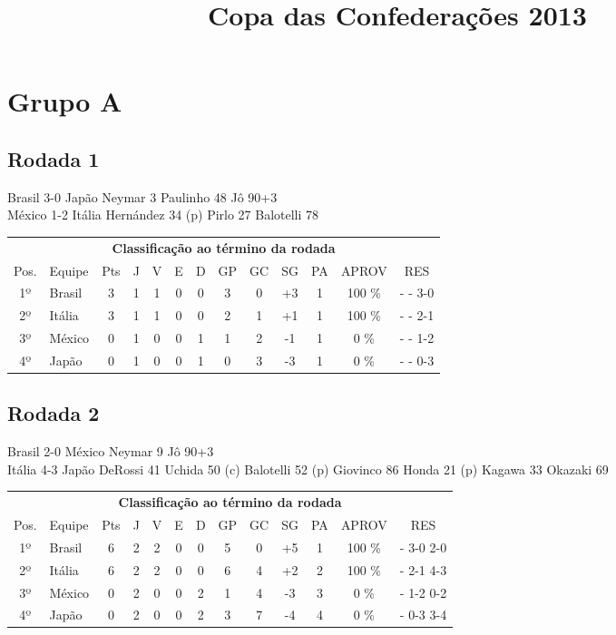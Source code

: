 \documentclass{article}
\title{\textbf{Copa das Confederações 2013}}
\author{}
\date{}
\begin{document}
\maketitle

\section*{Grupo A}
\subsection*{Rodada 1}
Brasil 3-0 Japão
Neymar 3
Paulinho 48
Jô 90+3
\\
México 1-2 Itália
Hernández 34 (p)
Pirlo 27
Balotelli 78
\\
\begin{center}
\begin{tabular}{| c | l | c | c | c | c | c | c | c | c | c | c | c |}
\multicolumn{13}{c}{\textbf{Classificação ao término da rodada}}\\
Pos.&Equipe&Pts&J&V&E&D&GP&GC&SG&PA&APROV&RES\\
1º&Brasil              &3&1	&1&0&0	&3&0&+3	&1&100 \%	& -  - 3-0 \\
2º&Itália              &3&1	&1&0&0	&2&1&+1	&1&100 \%	& -  - 2-1 \\
3º&México              &0&1	&0&0&1	&1&2&-1	&1&  0 \%	& -  - 1-2 \\
4º&Japão               &0&1	&0&0&1	&0&3&-3	&1&  0 \%	& -  - 0-3 \\
\end{tabular}
\end{center}


\subsection*{Rodada 2}
Brasil 2-0 México
Neymar 9
Jô 90+3
\\
Itália 4-3 Japão
DeRossi 41
Uchida 50 (c)
Balotelli 52 (p)
Giovinco 86
Honda 21 (p)
Kagawa 33
Okazaki 69
\\
\begin{center}
\begin{tabular}{| c | l | c | c | c | c | c | c | c | c | c | c | c |}
\multicolumn{13}{c}{\textbf{Classificação ao término da rodada}}\\
Pos.&Equipe&Pts&J&V&E&D&GP&GC&SG&PA&APROV&RES\\
1º&Brasil              &6&2	&2&0&0	&5&0&+5	&1&100 \%	& - 3-0 2-0 \\
2º&Itália              &6&2	&2&0&0	&6&4&+2	&2&100 \%	& - 2-1 4-3 \\
3º&México              &0&2	&0&0&2	&1&4&-3	&3&  0 \%	& - 1-2 0-2 \\
4º&Japão               &0&2	&0&0&2	&3&7&-4	&4&  0 \%	& - 0-3 3-4 \\
\end{tabular}
\end{center}
\end{document}
